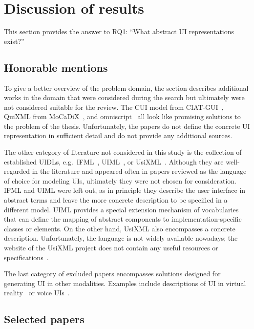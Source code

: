 \section{Discussion of results}\label{sec:review-discussion-of-results}

This section provides the answer to RQ1: \enquote{What abstract UI representations exist?}

\subsection{Honorable mentions}\label{subsec:honorable-mentions}
To give a better overview of the problem domain, the section describes additional works in the domain that were considered during the search but ultimately were not considered suitable for the review.
The CUI model from CIAT-GUI~\cite{Molina2012-my}, QuiXML from MoCaDiX~\cite{Vanderdonckt2019-av}, and omniscript~\cite{Ulusoy2019-jh} all look like promising solutions to the problem of the thesis.
Unfortunately, the papers do not define the concrete UI representation in sufficient detail and do not provide any additional sources.

The other category of literature not considered in this study is the collection of established UIDLs, e.g.\ IFML~\cite{Brambilla2014-ln}, UIML~\cite{Abrams1999}, or UsiXML~\cite{Limbourg2005}.
Although they are well-regarded in the literature and appeared often in papers reviewed as the language of choice for modeling UIs, ultimately they were not chosen for consideration.
IFML and UIML were left out, as in principle they describe the user interface in abstract terms and leave the more concrete description to be specified in a different model.
UIML provides a special extension mechanism of vocabularies that can define the mapping of abstract components to implementation-specific classes or elements.
On the other hand, UsiXML also encompasses a concrete description.
Unfortunately, the language is not widely available nowadays;
the website of the UsiXML project does not contain any useful resources or specifications~.

The last category of excluded papers encompasses solutions designed for generating UI in other modalities.
Examples include descriptions of UI in virtual reality~\cite{Olmedo2015} or voice UIs~\cite{steinberger2020domain}.

\subsection{Selected papers}\label{subsec:selected-papers}

